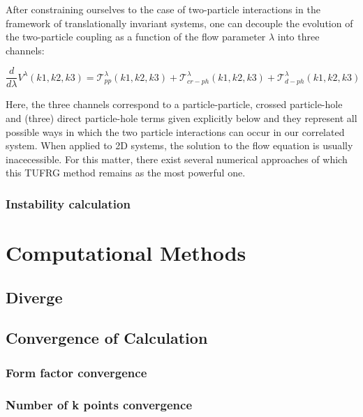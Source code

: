 \documentclass[12pt]{article}
\begin{document}
After constraining ourselves to the case of two-particle interactions in the framework of translationally invariant systems, one can decouple  the evolution of the two-particle coupling as a function of the flow parameter $\lambda$ into three channels:

\begin{equation}\label{3 channels}
    \frac{d}{d\lambda} V^{\lambda}(k1, k2, k3) = \mathcal{T}_{pp}^{\lambda}(k1,k2,k3) + \mathcal{T}_{cr-ph}^{\lambda}(k1,k2,k3) +\mathcal{T}_{d-ph}^{\lambda}(k1,k2,k3)
\end{equation}

\noindent Here, the three channels correspond to a particle-particle, crossed particle-hole and (three) direct particle-hole terms given explicitly below and they represent all possible ways in which the two particle interactions can occur in our correlated system. When applied to 2D systems, the solution to the flow equation is usually inacecessible. For this matter, there exist several numerical approaches of which this TUFRG method remains as the most powerful one.

\subsubsection{Instability calculation}




\section{Computational Methods}

\subsection{Diverge}

\subsection{Convergence of Calculation}
\label{subsec:convergence}

\subsubsection{Form factor convergence}

\subsubsection{Number of k points convergence }
\end{document}
